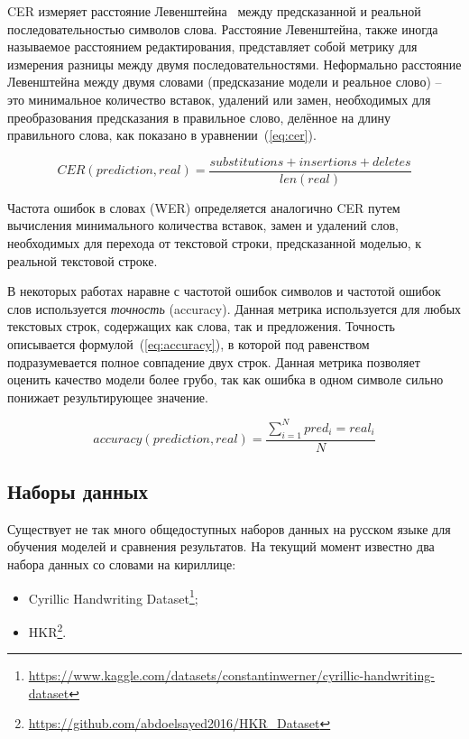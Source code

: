 CER измеряет расстояние Левенштейна~\cite{levenshtein1966binary} между предсказанной и реальной последовательностью символов слова.
Расстояние Левенштейна, также иногда называемое расстоянием редактирования,
представляет собой метрику для измерения разницы между двумя последовательностями.
Неформально расстояние Левенштейна между двумя словами (предсказание модели и реальное слово) --
это минимальное количество вставок, удалений или замен, необходимых для преобразования предсказания в правильное слово,
делённое на длину правильного слова, как показано в уравнении~(\ref{eq:cer}).

\begin{equation}
    \label{eq:cer}
    CER(prediction,real)=\frac{substitutions+insertions+deletes}{len(real)}
\end{equation}

Частота ошибок в словах (WER) определяется аналогично CER путем вычисления минимального количества вставок, замен и удалений слов,
необходимых для перехода от текстовой строки, предсказанной моделью, к реальной текстовой строке.

В некоторых работах наравне с частотой ошибок символов и частотой ошибок слов используется \textit{точность} (accuracy).
Данная метрика используется для любых текстовых строк, содержащих как слова, так и предложения.
Точность описывается формулой~(\ref{eq:accuracy}), в которой под равенством подразумевается полное совпадение двух строк.
Данная метрика позволяет оценить качество модели более грубо, так как ошибка в одном символе сильно понижает результирующее значение.

\begin{equation}
    \label{eq:accuracy}
    accuracy(prediction,real)=\frac{\sum_{i=1}^N pred_i = real_i}{N}
\end{equation}


\subsection{Наборы данных}
\label{subsec:datasets}

Существует не так много общедоступных наборов данных на русском языке для обучения моделей и сравнения результатов.
На текущий момент известно два набора данных со словами на кириллице:
\begin{itemize}
    \item Cyrillic Handwriting Dataset\footnote{\url{https://www.kaggle.com/datasets/constantinwerner/cyrillic-handwriting-dataset}};
    \item HKR\footnote{\url{https://github.com/abdoelsayed2016/HKR_Dataset}}.
\end{itemize}

